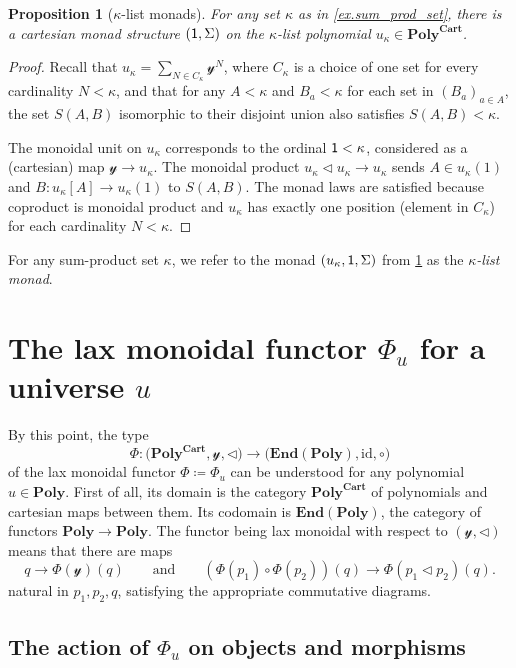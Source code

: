\documentclass[11pt, one side, article]{memoir}
\theoremstyle{definition}
\theoremstyle{plain}
\newtheorem{proposition}[definitionx]{Proposition}
\newcommand{\Cat}[1]{\mathbf{#1}}%
\newcommand{\id}{\mathrm{id}}
\newcommand{\too}{\longrightarrow}
\newcommand{\en}{\Cat{End}}
\newcommand{\yon}{\mathcal{y}}
\newcommand{\poly}{\Cat{Poly}}
\newcommand{\polycart}{\poly^{\Cat{Cart}}}
\newcommand{\0}{\textsf{0}}
\newcommand{\1}{\tn{\textsf{1}}}
\newcommand{\tri}{\mathbin{\triangleleft}}
\newcommand{\qqand}{\qquad\text{and}\qquad}
\begin{document}
\begin{proposition}[$\kappa$-list monads]\label{prop.list_monad}
For any set $\kappa$ as in \cref{ex.sum_prod_set}, there is a cartesian monad structure $(\1,\Sigma)$ on the $\kappa$-list polynomial $u_\kappa\in\polycart$.
\end{proposition}
\begin{proof}
Recall that $u_\kappa=\sum_{N\in C_\kappa}\yon^N$, where $C_\kappa$ is a choice of one set for every cardinality $N<\kappa$, and that for any $A<\kappa$ and $B_a<\kappa$ for each set in $(B_a)_{a\in A}$, the set $S(A,B)$ isomorphic to their disjoint union also satisfies $S(A,B)<\kappa$. 

The monoidal unit on $u_\kappa$ corresponds to the ordinal $\1<\kappa$, considered as a (cartesian) map $\yon\to u_\kappa$. The monoidal product $u_\kappa\tri u_\kappa\to u_\kappa$ sends $A\in u_\kappa(1)$ and $B\colon u_\kappa[A]\to u_\kappa(1)$ to $S(A,B)$. The monad laws are satisfied because coproduct is monoidal product and $u_\kappa$ has exactly one position (element in $C_\kappa$) for each cardinality $N<\kappa$. 
\end{proof}

For any sum-product set $\kappa$, we refer to the monad $(u_\kappa,\1,\Sigma)$ from \cref{prop.list_monad} as the \emph{$\kappa$-list monad}.

\chapter{The lax monoidal functor $\Phi_u$ for a universe $u$}

By this point, the type 
\[
\Phi\colon\Big(\polycart,\yon,\tri\Big)\too\Big(\en(\poly),\id,\circ\Big)
\]	
of the lax monoidal functor $\Phi\coloneqq\Phi_u$ can be understood for any polynomial $u\in\poly$. First of all, its domain is the category $\polycart$ of polynomials and cartesian maps between them. Its codomain is $\en(\poly)$, the category of functors $\poly\to\poly$. The functor being lax monoidal with respect to $(\yon,\tri)$ means that there are maps
\[
q\to\Phi(\yon)(q)
\qqand
(\Phi(p_1)\circ\Phi(p_2))(q)\to \Phi(p_1\tri p_2)(q).
\]
natural in $p_1,p_2,q$, satisfying the appropriate commutative diagrams.

\section{The action of $\Phi_u$ on objects and morphisms}
\end{document}
